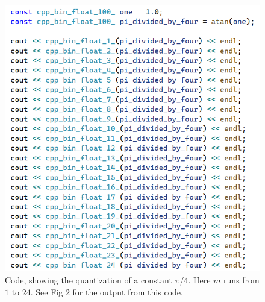 \documentclass[12pt]{article}
\begin{document}
\pagebreak



\begin{figure} 
\centering
\label{fig1}
  \includegraphics[width = 6 in]{code.png}
  \caption{
Code, showing the quantization of a constant $\pi/4$.
Here $m$ runs from $1$ to $24$.
See Fig 2 for the output from this code.
}
\end{figure}
\end{document}
